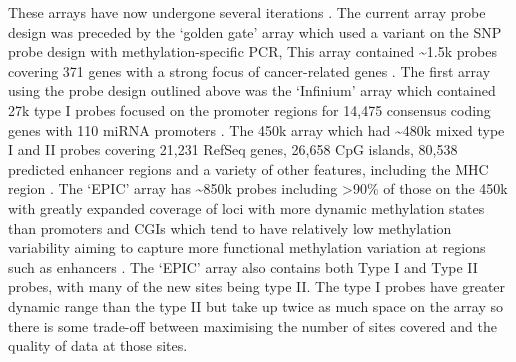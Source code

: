 \documentclass[]{book}
\begin{document}
These arrays have now undergone several iterations \citep[\citet{Bibikova2011},\citet{Moran2015}]{Bibikova2009}. The current array probe design was preceded by the `golden gate' array which used a variant on the SNP probe design with methylation-specific PCR, This array contained \textasciitilde1.5k probes covering 371 genes with a strong focus of cancer-related genes \citep{Bibikova2006}. The first array using the probe design outlined above was the `Infinium' array which contained 27k type I probes focused on the promoter regions for 14,475 consensus coding genes with 110 miRNA promoters \citep{Bibikova2009}. The 450k array which had \textasciitilde480k mixed type I and II probes covering 21,231 RefSeq genes, 26,658 CpG islands, 80,538 predicted enhancer regions and a variety of other features, including the MHC region \citep{Bibikova2011}. The `EPIC' array has \textasciitilde850k probes including \textgreater90\% of those on the 450k with greatly expanded coverage of loci with more dynamic methylation states than promoters and CGIs which tend to have relatively low methylation variability aiming to capture more functional methylation variation at regions such as enhancers \citep[\citet{Ziller2013}]{Moran2015}. The `EPIC' array also contains both Type I and Type II probes, with many of the new sites being type II. The type I probes have greater dynamic range than the type II but take up twice as much space on the array so there is some trade-off between maximising the number of sites covered and the quality of data at those sites.
\end{document}
